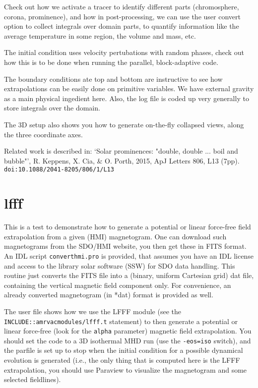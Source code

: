 \documentclass[10pt]{article}
\begin{document}
Check out how we activate a tracer to identify different parts (chromosphere, corona, prominence), and how in post-processing, we can use the user convert option to collect integrals over domain parts, to quantify information like the average temperature in some region, the volume and mass, etc.

The initial condition uses velocity pertubations with random phases, check out how this is to be done when running the parallel, block-adaptive code.

The boundary conditions ate top and bottom are instructive to see how extrapolations can be easily done on primitive variables. We have external gravity as a main physical ingedient here. Also, the log file is coded up very generally to store integrals over the domain.

The 3D setup also shows you how to generate on-the-fly collapsed views, along the three coordinate axes.

Related work is described in:
`Solar prominences: "double, double ... boil and bubble"', R. Keppens, X. Cia, \& O. Porth, 2015, ApJ Letters 806, L13 (7pp). {\tt doi:10.1088/2041-8205/806/1/L13}


\section*{lfff}

This is a test to demonstrate how to generate a potential or linear force-free field extrapolation from a given (HMI) magnetogram. One can download such magnetograms from the SDO/HMI website, you then get these in FITS format. An IDL script {\tt converthmi.pro} is provided, that assumes you have an IDL license and access to the library solar software (SSW) for SDO data handling. This routine just converts the FITS file into a (binary, uniform Cartesian grid) dat file, containing the vertical magnetic field component only. For convenience, an already converted magnetogram (in *dat) format is provided as well.

The user file shows how we use the LFFF module (see the {\tt INCLUDE::amrvacmodules/lfff.t} statement) to then generate a potential or linear force-free (look for the {\tt alpha} parameter) magnetic field extrapolation. You should set the code to a 3D isothermal MHD run (use the {\tt -eos=iso} switch), and the parfile is set up to stop when the initial condition for a possible dynamical evolution is generated (i.e., the only thing that is computed here is the LFFF extrapolation, you should use Paraview to visualize the magnetogram and some selected fieldlines).
\end{document}
